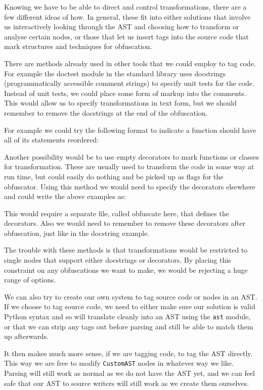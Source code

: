 \documentclass{report}
\begin{document}
Knowing we have to be able to direct and control transformations, there are a few different ideas of how. In general, these fit into
either solutions that involve us interactively looking through the AST and choosing how to transform or analyse certain
nodes, or those that let us insert tags into the source code that mark structures and techniques for obfuscation.

There are methods already used in other tools that we could employ to tag code. For example the doctest module in the standard
library uses docstrings (programmatically accessible comment strings) to specify unit tests for the code. Instead of unit tests,
we could place some form of markup into the comments. This would allow us to specify transformations in text form, but we should
remember to remove the docstrings at the end of the obfuscation.

For example we could try the following format to indicate a function should have all of its statements reordered:



Another possibility would be to use empty decorators to mark functions or classes for transformation. These are usually used to
transform the code in some way at run time, but could easily do nothing and be picked up as flags for the obfuscator. Using this
method we would need to specify the decorators elsewhere and could write the above examples as:



This would require a separate file, called obfuscate here, that defines the decorators. Also we would need to remember to
remove these decorators after obfuscation, just like in the docstring example.

The trouble with these methods is that transformations would be restricted to single nodes that support either docstrings or
decorators. By placing this constraint on any obfuscations we want to make, we would be rejecting a huge range of options.

We can also try to create our own system to tag source code or nodes in an AST. If we choose to tag source code, we need
to either make sure our solution is valid Python syntax and so will translate cleanly into an AST using the \texttt{ast}
module, or that we can strip any tags out before parsing and still be able to match them up afterwards.

It then makes much more sense, if we are tagging code, to tag the AST directly. This way we are free to modify \texttt{CustomAST}
nodes in whatever way we like. Parsing will still work as normal as we do not have the AST yet, and we can feel safe that our AST
to source writers will still work as we create them ourselves.
\end{document}
